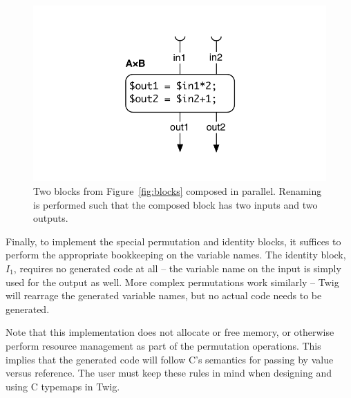\begin{figure}[ht]
\centering
\includegraphics[width=0.75\columnwidth]{images/code-gen3}
\caption{Two blocks from Figure~\ref{fig:blocks} composed in parallel. Renaming is performed such that the composed block has two inputs and two outputs.}
\label{fig:codegen-par}
\end{figure}

Finally, to implement the special permutation and identity blocks, it suffices to perform the appropriate bookkeeping on the variable names. The identity block, $I_1$, requires no generated code at all -- the variable name on the input is simply used for the output as well. More complex permutations work similarly -- Twig will rearrage the generated variable names, but no actual code needs to be generated.

Note that this implementation does not allocate or free memory, or otherwise perform resource management as part of the permutation operations. This implies that the generated code will follow C's semantics for passing by value versus reference. The user must keep these rules in mind when designing and using C typemaps in Twig.
